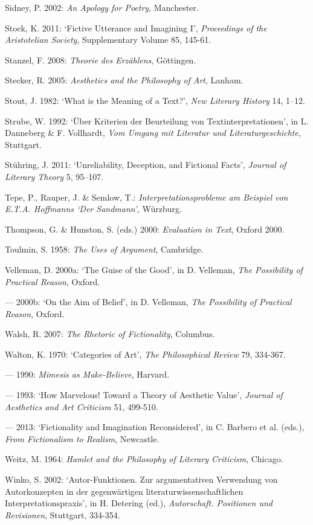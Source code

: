 \begin{hangparas}{.5cm}{1}
Sidney, P. 2002: \emph{An Apology for Poetry}, Manchester.

Stock, K. 2011: `Fictive Utterance and Imagining I', \emph{Proceedings of the Aristotelian Society}, Supplementary Volume 85, 145-61.

Stanzel, F. 2008: \emph{Theorie des Erz\"ahlens}, G\"ottingen. 

Stecker, R. 2005: \emph{Aesthetics and the Philosophy of Art}, Lanham.

Stout, J. 1982: `What is the Meaning of a Text?', \emph{New Literary History} 14, 1--12.

Strube, W. 1992: `\"Uber Kriterien der Beurteilung von Textinterpretationen', in L. Danneberg \& F. Vollhardt, \emph{Vom Umgang mit Literatur und Literaturgeschichte}, Stuttgart.

St\"uhring, J. 2011: `Unreliability, Deception, and Fictional Facts', \emph{Journal of Literary Theory} 5, 95--107.

Tepe, P., Rauper, J. \& Semlow, T.: \emph{Interpretationsprobleme am Beispiel von E.T.A. Hoffmanns `Der Sandmann',} W\"urzburg.

Thompson, G. \& Hunston, S. (eds.) 2000: \emph{Evaluation in Text}, Oxford 2000.

Toulmin, S. 1958: \emph{The Uses of Argument}, Cambridge.

Velleman, D. 2000a: `The Guise of the Good', in D. Velleman, \emph{The Possibility of Practical Reason}, Oxford.

--- 2000b: `On the Aim of Belief', in D. Velleman, \emph{The Possibility of Practical Reason}, Oxford.

Walsh, R. 2007: \emph{The Rhetoric of Fictionality}, Columbus.

Walton, K. 1970: `Categories of Art', \emph{The Philosophical Review} 79, 334-367.

--- 1990: \emph{Mimesis as Make-Believe}, Harvard.

--- 1993: `How Marvelous! Toward a Theory of Aesthetic Value', \emph{Journal of Aesthetics and Art Criticism} 51, 499-510.

--- 2013: `Fictionality and Imagination Reconsidered', in C. Barbero et al. (eds.), \emph{From Fictionalism to Realism}, Newcastle.

Weitz, M. 1964: \emph{Hamlet and the Philosophy of Literary Criticism}, Chicago.

Winko, S. 2002: `Autor-Funktionen. Zur argumentativen Verwendung von Autorkonzepten in der gegenw\"artigen literaturwissenschaftlichen Interpretationspraxis', in H. Detering (ed.), \emph{Autorschaft. Positionen und Revisionen}, Stuttgart, 334-354.


\end{hangparas}
